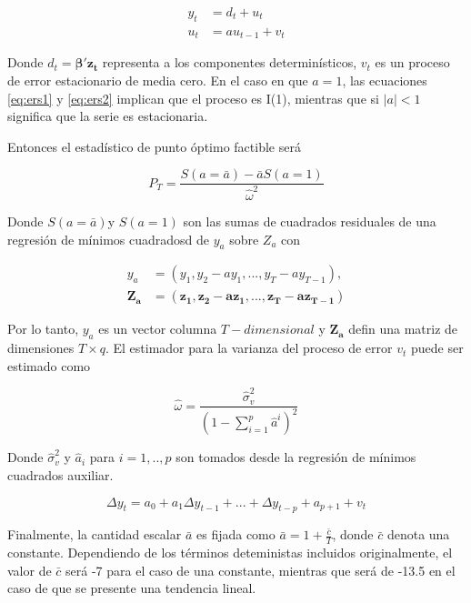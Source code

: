 \documentclass[12pt, twoside]{book}\usepackage[]{graphicx}\usepackage[]{color}
\numberwithin{equation}{section}
\numberwithin{theorem}{section}
\numberwithin{teorema}{section}
\numberwithin{defi}{section}
\numberwithin{prop}{section}
\numberwithin{defi}{section}
\theoremstyle{plain}
\begin{document}
\begin{align}
y_{t} & = d_{t}+u_{t} \label{eq:ers1}\\ 
u_{t} & = a u_{t-1}+v_{t} \label{eq:ers2}
\end{align}

Donde $d_{t}=\boldsymbol{\beta' z_{t}}$ representa a los componentes determinísticos, $v_{t}$ es un proceso de error estacionario de media cero. En el caso en que $a=1$, las ecuaciones  \ref{eq:ers1} y \ref{eq:ers2} implican que el proceso es I(1), mientras que si $|a|<1$ significa que la serie es estacionaria. 

Entonces el estadístico de punto óptimo factible será 

\begin{equation}
P_{T} = \frac{S(a=\bar{a})-\bar{a}S(a=1)}{\hat{\omega}^{2}}
\end{equation}

Donde $S(a=\bar{a})$y $S(a=1)$ son las sumas de cuadrados residuales de una regresión de mínimos cuadradosd de $y_{a}$ sobre $Z_{a}$ con 

\begin{align}
y_{a} & = (y_{1}, y_{2}-a y_{1},...,y_{T}-ay_{T-1}), \\
\boldsymbol{Z_{a}} & = (\boldsymbol{z_{1},z_{2}-a z_{1},..., z_{T}-a z_{T-1}})
\end{align}

Por lo tanto, $y_{a}$ es un vector columna $T-dimensional$ y $\boldsymbol{Z_{a}}$ defin una matriz de dimensiones $T\times q$. El estimador para la varianza del proceso de error $v_{t}$ puede ser estimado como 

\begin{equation}
\hat{\omega} = \frac{\hat{\sigma}^{2}_{v}}{(1-\sum_{i=1}^{p}\hat{a}^{i})^{2}}
\end{equation}

Donde $\hat{\sigma}^{2}_{v}$ y $\hat{a}_{i}$ para $i=1,..,p$ son tomados desde la regresión de mínimos cuadrados auxiliar. 

\begin{equation}
\Delta y_{t} = a_{0}+a_{1}\Delta y_{t-1}+...+\Delta y_{t-p}+a_{p+1}+v_{t}
\end{equation}

Finalmente, la cantidad escalar $\bar{a}$ es fijada como $\bar{a}=1+\frac{\bar{c}}{T}$, donde $\bar{c}$ denota una constante. Dependiendo de los términos deteministas incluidos originalmente, el valor de $\bar{c}$ será -7 para el caso de una constante, mientras que será de -13.5 en el caso de que se presente una tendencia lineal. 
\end{document}
